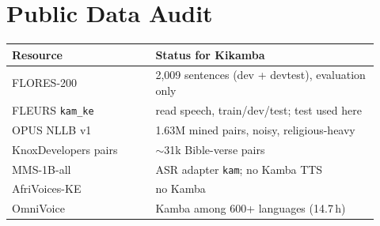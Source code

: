 \section{Public Data Audit}
\label{app:audit}

\begin{small}
\begin{tabular}{@{}p{0.36\linewidth}p{0.56\linewidth}@{}}
\toprule
Resource & Status for Kikamba \\
\midrule
FLORES-200 & 2,009 sentences (dev + devtest), evaluation only \\
FLEURS \texttt{kam\_ke} & read speech, train/dev/test; test used here \\
OPUS NLLB v1 & 1.63M mined pairs, noisy, religious-heavy \\
KnoxDevelopers pairs & ${\sim}$31k Bible-verse pairs \\
MMS-1B-all & ASR adapter \texttt{kam}; no Kamba TTS \\
AfriVoices-KE & no Kamba \\
OmniVoice & Kamba among 600+ languages (14.7\,h) \\
\bottomrule
\end{tabular}
\end{small}

